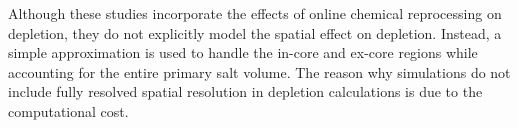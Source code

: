 Although these studies incorporate the effects of online chemical reprocessing on depletion, they do not explicitly model the spatial effect on depletion.
Instead, a simple approximation is used to handle the in-core and ex-core regions while accounting for the entire primary salt volume.
The reason why simulations do not include fully resolved spatial resolution in depletion calculations is due to the computational cost.